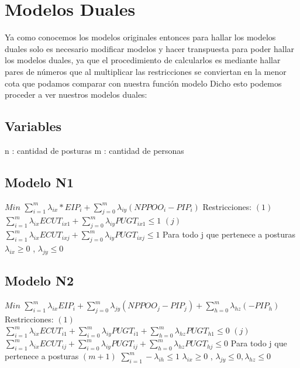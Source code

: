 \documentclass{llncs}
\begin{document}
\newpage

\section{Modelos Duales}
Ya como conocemos los modelos originales entonces para hallar los modelos duales solo es necesario modificar modelos y hacer transpuesta para poder hallar los modelos duales, ya que el procedimiento de calcularlos es mediante hallar pares de números que al multiplicar las restricciones se conviertan en la menor cota que podamos comparar con nuestra función modelo
\newline
\newline
Dicho esto podemos proceder a ver nuestros modelos duales:

\subsection{Variables}

n : cantidad de posturas
\newline
m : cantidad de personas

\subsection{Modelo N1}
$Min$ $\sum_{i=1}^{m} \lambda_{ix}*EIP_{i} + \sum_{j = 0}^{m} \lambda_{iy}(NPPOO_{i} - PIP_{i})$
\newline
\newline
Restricciones:
\newline
$(1)$  $\sum_{i = 1}^{m} \lambda_{ix}ECUT_{ix1} + \sum_{j = 0}^{m} \lambda_{iy}PUGT_{ix1} \leq 1$
\newline
$(j)$ $\sum_{i = 1}^{m} \lambda_{ix}ECUT_{ixj} + \sum_{j = 0}^{m} \lambda_{iy}PUGT_{ixj} \leq 1 $
\newline
Para todo j que pertenece a posturas
\newline
\newline
$\lambda_{ix} \geq 0$ , $\lambda_{jy} \leq 0$

\subsection{Modelo N2}
$Min$ $\sum_{i = 1}^{m} \lambda_{ix}EIP_{i} + \sum_{j = 0}^{m} \lambda_{jy}(NPPOO_{j}-PIP_{j}) + \sum_{h = 0}^{m} \lambda_{hz}(-PIP_{h})$
\newline
\newline
Restricciones:
\newline
$(1)$  $\sum_{i = 1}^{m} \lambda_{ix}ECUT_{i1} + \sum_{i = 0}^{m} \lambda_{iy}PUGT_{i1} + \sum_{h = 0}^{m}\lambda_{hz}PUGT_{h1}\leq 0$
\newline
$(j)$ $\sum_{i = 1}^{m} \lambda_{ix}ECUT_{ij} + \sum_{i = 0}^{m} \lambda_{iy}PUGT_{ij} + \sum_{h = 0}^{m}\lambda_{hz}PUGT_{hj} \leq 0 $
\newline
Para todo j que pertenece a posturas
\newline
\newline
$(m+1)$ $\sum_{i = 1}^{m} -\lambda_{ih}  \leq 1$
\newline
\newline
$\lambda_{ix} \geq 0$ , $\lambda_{jy} \leq 0, \lambda_{hz} \leq 0$
\end{document}
